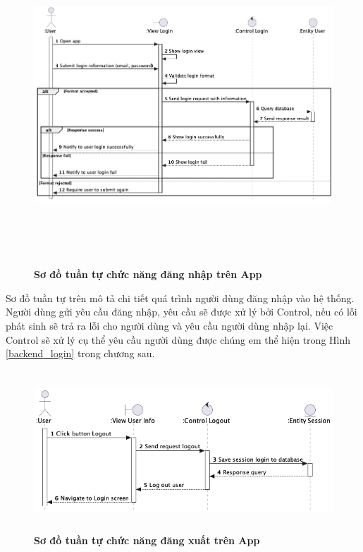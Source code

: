     \begin{figure}[H]
         \centering
         \includegraphics[width=16cm,height=12cm]{Images/mobile_app/login.png}
         \caption[Sơ đồ tuần tự chức năng đăng nhập trên App]{\bfseries \fontsize{12pt}{0pt}
         \selectfont Sơ đồ tuần tự chức năng đăng nhập trên App}
         \label{login} %
    \end{figure}

  Sơ đồ tuần tự trên mô tả chi tiết quá trình người dùng đăng nhập vào hệ thống. Người dùng gửi yêu cầu đăng nhập, yêu cầu sẽ
  được xử lý bởi Control, nếu có lỗi phát sinh sẽ trả ra lỗi cho người dùng và yêu cầu người dùng nhập lại. Việc Control
  sẽ xử lý cụ thể yêu cầu người dùng được chúng em thể hiện trong Hình \ref{backend_login} trong chương sau.

  \begin{figure}[H]
    \centering
    \includegraphics[width=12cm,height=6cm]{Images/mobile_app/logout.png}
    \caption[Sơ đồ tuần tự chức năng đăng xuất trên App]{\bfseries \fontsize{12pt}{0pt}
    \selectfont Sơ đồ tuần tự chức năng đăng xuất trên App}
    \label{logout} %
\end{figure}

